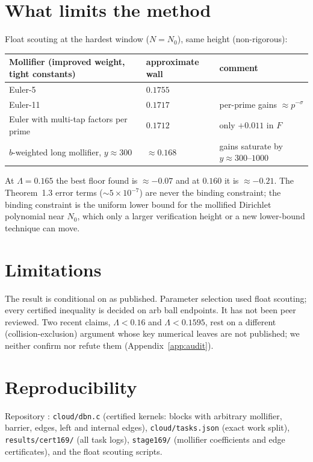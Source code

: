 \documentclass[11pt]{amsart}
\begin{document}
\section{What limits the method}\label{sec:limits}
Float scouting at the hardest window ($N=N_0$), same height (non-rigorous):
\begin{center}
\begin{tabular}{lll}
\toprule
Mollifier (improved weight, tight constants) & approximate wall & comment \\ \midrule
Euler-5 & $0.1755$ & \\
Euler-11 & $0.1717$ & per-prime gains $\approx p^{-\sigma}$ \\
Euler with multi-tap factors per prime & $0.1712$ & only $+0.011$ in $F$ \\
$b$-weighted long mollifier, $y\approx300$ & $\approx0.168$ & gains saturate by $y\approx300$--$1000$ \\
\bottomrule
\end{tabular}
\end{center}
At $\Lambda=0.165$ the best floor found is $\approx-0.07$ and at $0.160$ it is $\approx-0.21$. The Theorem~1.3 error
terms ($\sim5\times10^{-7}$) are never the binding constraint; the binding constraint is the uniform lower bound for the
mollified Dirichlet polynomial near $N_0$, which only a larger verification height or a new lower-bound technique can move.

\section{Limitations}
The result is conditional on \cite{pm15,pt} as published. Parameter selection used float scouting; every certified
inequality is decided on arb ball endpoints. It has not been peer reviewed. Two recent claims, $\Lambda<0.16$ and
$\Lambda<0.1595$, rest on a different (collision-exclusion) argument whose key numerical leaves are not published; we
neither confirm nor refute them (Appendix~\ref{app:audit}).

\section{Reproducibility}
Repository \cite{repo}: \texttt{cloud/dbn.c} (certified kernels: blocks with arbitrary mollifier, barrier, edges, left and
internal edges), \texttt{cloud/tasks.json} (exact work split), \texttt{results/cert169/} (all task logs),
\texttt{stage169/} (mollifier coefficients and edge certificates), and the float scouting scripts.
\end{document}
